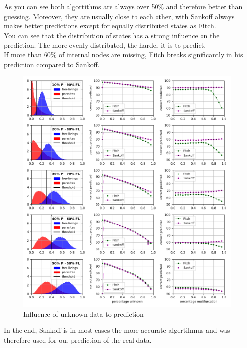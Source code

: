       As you can see both algortithms are always over 50\% and therefore better than guessing. Moreover, 
        they are usually close to each other, with Sankoff always makes better predictions except for 
        equally distributed states as Fitch. \\
      You can see that the distribution of states has a strong influence on the prediction. The more 
        evenly distributed, the harder it is to predict. \\
      If more than 60\% of internal nodes are missing, Fitch breaks significantly in his prediction 
        compared to Sankoff.
      
      \begin{figure}
        \centering
        \includegraphics[trim = 0mm 0mm 0mm 0mm, clip,width=\textwidth]{Figures/simulation_evaluation_1.png}
        \caption{Influence of unknown data to prediction}
        \label{fig:influence of unknown data}
      \end{figure}

      In the end, Sankoff is in most cases the more accurate algortihmus and was therefore used for our 
        prediction of the real data.

